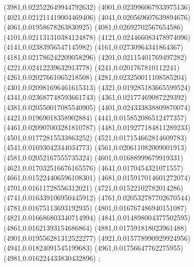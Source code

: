 {(3981,0.022522649944792632)
(4001,0.023996067933975136)
(4021,0.021211419004469406)
(4041,0.020569607639894676)
(4061,0.01958678263830925)
(4081,0.02692702567654586)
(4101,0.021131310384124878)
(4121,0.024466083478974096)
(4141,0.02383956547145982)
(4161,0.02730964341864367)
(4181,0.021786242209058296)
(4201,0.02115401769497282)
(4221,0.02412239632913778)
(4241,0.0201767810112241)
(4261,0.02027661065218508)
(4281,0.023250011108585204)
(4301,0.020981696461615313)
(4321,0.019285183665599524)
(4341,0.023687748593661743)
(4361,0.02177469087229392)
(4381,0.020550017085540905)
(4401,0.024333838809870074)
(4421,0.01969018358902884)
(4441,0.015852086512477357)
(4461,0.020907003281810787)
(4481,0.019277184811289233)
(4501,0.01772815533863252)
(4521,0.017154662814609783)
(4541,0.01693042344034773)
(4561,0.020611082009001913)
(4581,0.02052167555735324)
(4601,0.01688999679919331)
(4621,0.017032516676165576)
(4641,0.0170454321071557)
(4661,0.015224406596108301)
(4681,0.015917014601272074)
(4701,0.01611728556312021)
(4721,0.01522102782014286)
(4741,0.016339106950445912)
(4761,0.020532787702670544)
(4781,0.01675113693192935)
(4801,0.016767486940151087)
(4821,0.016686803340714994)
(4841,0.014898004377502595)
(4861,0.01621393154686864)
(4881,0.017591818023961488)
(4901,0.019556281312522277)
(4921,0.015778990929924956)
(4941,0.01824091545199683)
(4961,0.01756647762275955)
(4981,0.016224433830432896)
};
